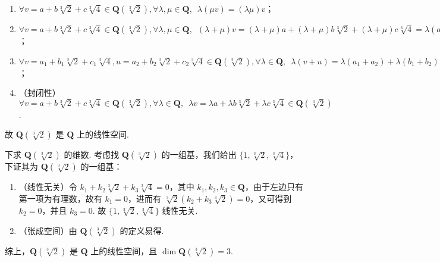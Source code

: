 \begin{exercise}
\begin{exgroup}
\begin{answer}
\begin{enumerate}
                \item $\forall v = a+b\sqrt[3]{2}+c\sqrt[3]{4} \in \mathbf{Q}(\sqrt[3]{2}), \forall \lambda, \mu \in \mathbf{Q}, \enspace \lambda(\mu v) = (\lambda \mu) v$；

                \item $\forall v = a+b\sqrt[3]{2}+c\sqrt[3]{4} \in \mathbf{Q}(\sqrt[3]{2}), \forall \lambda, \mu \in \mathbf{Q}, \enspace (\lambda + \mu) v = (\lambda + \mu)a + (\lambda + \mu) b\sqrt[3]{2} + (\lambda + \mu) c\sqrt[3]{4} = \lambda(a+b\sqrt[3]{2}+c\sqrt[3]{4}) + \mu(a+b\sqrt[3]{2}+c\sqrt[3]{4}) = \lambda v + \mu v$；

                \item $\forall v = a_1 + b_1\sqrt[3]{2} + c_1\sqrt[3]{4}, u = a_2 + b_2\sqrt[3]{2} + c_2\sqrt[3]{4} \in \mathbf{Q}(\sqrt[3]{2}), \forall \lambda \in \mathbf{Q}, \enspace \lambda(v+u) = \lambda (a_1 + a_2) + \lambda (b_1 + b_2)\sqrt[3]{2} + \lambda (c_1 + c_2)\sqrt[3]{4} = \lambda (a_1 + b_1\sqrt[3]{2} + c_1\sqrt[3]{4}) + \lambda (a_2 + b_2\sqrt[3]{2} + c_2\sqrt[3]{4}) = \lambda v + \lambda u$；

                \item （封闭性）$\forall v = a+b\sqrt[3]{2}+c\sqrt[3]{4} \in \mathbf{Q}(\sqrt[3]{2}), \forall \lambda \in \mathbf{Q}, \enspace \lambda v = \lambda a + \lambda b\sqrt[3]{2} + \lambda c\sqrt[3]{4} \in \mathbf{Q}(\sqrt[3]{2})$.
            \end{enumerate}
            故 $\mathbf{Q}(\sqrt[3]{2})$ 是 $\mathbf{Q}$ 上的线性空间.

            下求 $\mathbf{Q}(\sqrt[3]{2})$ 的维数. 考虑找 $\mathbf{Q}(\sqrt[3]{2})$ 的一组基，我们给出 $\{1, \sqrt[3]{2}, \sqrt[3]{4}\}$，下证其为 $\mathbf{Q}(\sqrt[3]{2})$ 的一组基：

            \begin{enumerate}
                \item （线性无关）令 $k_1 + k_2 \sqrt[3]{2} + k_3 \sqrt[3]{4} = 0$，其中 $k_1, k_2, k_3 \in \mathbf{Q}$，由于左边只有第一项为有理数，故有 $k_1 = 0$，进而有 $\sqrt[3]{2} (k_2 + k_3 \sqrt[3]{2}) = 0$，又可得到 $k_2 = 0$，并且 $k_3 = 0$. 故 $\{1, \sqrt[3]{2}, \sqrt[3]{4}\}$ 线性无关.

                \item （张成空间）由 $\mathbf{Q}(\sqrt[3]{2})$ 的定义易得.
            \end{enumerate}
            综上，$\mathbf{Q}(\sqrt[3]{2})$ 是 $\mathbf{Q}$ 上的线性空间，且 $\dim \mathbf{Q}(\sqrt[3]{2}) = 3$.


\end{answer}
\end{exgroup}
\end{exercise}
